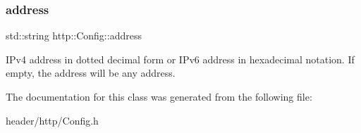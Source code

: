 \subsubsection{\texorpdfstring{address}{address}}
{\footnotesize\ttfamily std\+::string http\+::\+Config\+::address}

I\+Pv4 address in dotted decimal form or I\+Pv6 address in hexadecimal notation. If empty, the address will be any address. 

The documentation for this class was generated from the following file\+:\begin{DoxyCompactItemize}
\item 
header/http/Config.\+h\end{DoxyCompactItemize}

